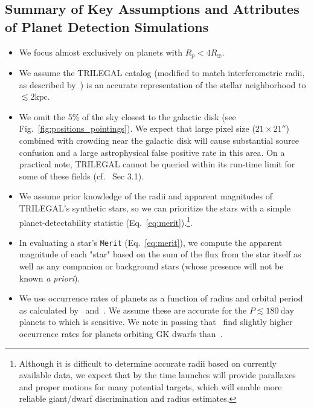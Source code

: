 \subsection{Summary of Key Assumptions and Attributes of Planet Detection 
Simulations}
\label{sec:input_assumptions}

\begin{itemize}
  
	\item We focus almost exclusively on planets with $R_p < 4R_\oplus$.

        \item We assume the TRILEGAL catalog (modified to match
          interferometric radii, as described
          by~) is an accurate representation
          of the stellar neighborhood to $\lesssim2\text{kpc}$.

        \item We omit the 5\% of the sky closest to the galactic disk
          (see Fig.~\ref{fig:positions_pointings}). We expect that
          \tesss large pixel size ($21\times21''$) combined with
          crowding near the galactic disk will cause substantial
          source confusion and a large astrophysical false positive
          rate in this area.  On a practical note, TRILEGAL cannot be
          queried within its run-time limit for some of these fields
          (cf.~ Sec 3.1).
        
	\item We assume prior knowledge of the radii and apparent
          magnitudes of TRILEGAL's synthetic stars, so we can
          prioritize the stars with a simple planet-detectability statistic
          (Eq.~\ref{eq:merit}).\footnote{Although it is difficult to determine
            accurate radii based on currently available data, we expect that by the time
            \tess launches \gaia will provide parallaxes and proper
            motions for many potential \tess targets, which will enable more reliable giant/dwarf discrimination and radius estimates.}.
          
	\item In evaluating a star's \texttt{Merit}
          (Eq.~\ref{eq:merit}), we compute the apparent magnitude of each "star"
          based on the sum of the flux from the star
          itself as well as any companion or background stars
          (whose presence will not be known {\it a priori}).
	            
	\item We use occurrence rates of planets as a function of radius
          and orbital period as calculated by~\citet{fressin_false_2013}
          and~\citet{dressing_occurrence_2015}.
          We assume these are accurate for the 
          $P \lesssim 180\ \text{day}$ planets to which \tess is 
          sensitive. We note in passing that~\citet{burke_terrestrial_2015} 
          find slightly higher occurrence rates for planets orbiting GK dwarfs 
          than~\citet{fressin_false_2013}.
          

\end{itemize}
